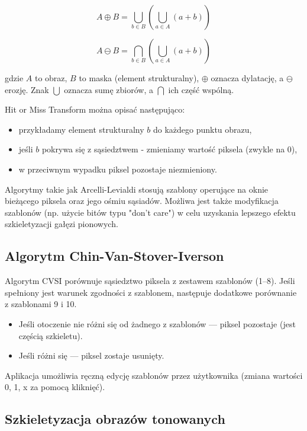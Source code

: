 \begin{equation}
	A \oplus B = \bigcup_{b \in B} \left( \bigcup_{a \in A} (a + b) \right)
\end{equation}

\begin{equation}
	A \ominus B = \bigcap_{b \in B} \left( \bigcup_{a \in A} (a + b) \right)
\end{equation}

gdzie $A$ to obraz, $B$ to maska (element strukturalny), $\oplus$ oznacza dylatację, a $\ominus$ erozję. Znak $\bigcup$ oznacza sumę zbiorów, a $\bigcap$ ich część wspólną.

Hit or Miss Transform można opisać następująco:
\begin{itemize}
	\item przykładamy element strukturalny $b$ do każdego punktu obrazu,
	\item jeśli $b$ pokrywa się z sąsiedztwem - zmieniamy wartość piksela (zwykle na 0),
	\item w przeciwnym wypadku piksel pozostaje niezmieniony.
\end{itemize}

Algorytmy takie jak Arcelli-Levialdi stosują szablony operujące na oknie bieżącego piksela oraz jego ośmiu sąsiadów. Możliwa jest także modyfikacja szablonów (np. użycie bitów typu "don't care") w celu uzyskania lepszego efektu szkieletyzacji gałęzi pionowych.

\subsection{Algorytm Chin-Van-Stover-Iverson}

Algorytm CVSI porównuje sąsiedztwo piksela z zestawem szablonów (1--8). Jeśli spełniony jest warunek zgodności z szablonem, następuje dodatkowe porównanie z szablonami 9 i 10. 

\begin{itemize}
	\item Jeśli otoczenie nie różni się od żadnego z szablonów — piksel pozostaje (jest częścią szkieletu).
	\item Jeśli różni się — piksel zostaje usunięty.
\end{itemize}

Aplikacja umożliwia ręczną edycję szablonów przez użytkownika (zmiana wartości 0, 1, x za pomocą kliknięć).

\subsection{Szkieletyzacja obrazów tonowanych}


